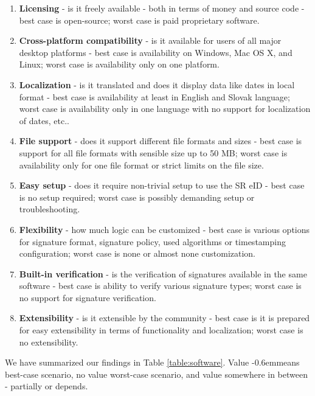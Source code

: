 \documentclass[thesismargins, english, thesislinespacing, onelinechapterstyle, upjsfrontpage]{rnthesis}
\newcommand\doublecheck{\checkmark\kern-0.6em\checkmark}
\begin{document}
\begin{enumerate}
  \item \textbf{Licensing} - is it freely available - both in terms of money and source code - best case is open-source; worst case is paid proprietary software.
  \item \textbf{Cross-platform compatibility} - is it available for users of all major desktop platforms - best case is availability on Windows, Mac OS X, and Linux; worst case is availability only on one platform.
  \item \textbf{Localization} - is it translated and does it display data like dates in local format - best case is availability at least in English and Slovak language; worst case is availability only in one language with no support for localization of dates, etc..
  \item \textbf{File support} - does it support different file formats and sizes - best case is support for all file formats with sensible size up to 50 MB; worst case is availability only for one file format or strict limits on the file size.
  \item \textbf{Easy setup} - does it require non-trivial setup to use the SR eID - best case is no setup required; worst case is possibly demanding setup or troubleshooting.
  \item \textbf{Flexibility} - how much logic can be customized - best case is various options for signature format, signature policy, used algorithms or timestamping configuration; worst case is none or almost none customization.
  \item \textbf{Built-in verification} - is the verification of signatures available in the same software - best case is ability to verify various signature types; worst case is no support for signature verification.
  \item \textbf{Extensibility} - is it extensible by the community - best case is it is prepared for easy extensibility in terms of functionality and localization; worst case is no extensibility.
\end{enumerate}

We have summarized our findings in Table \ref{table:software}. Value \doublecheck means best-case scenario, no value worst-case scenario, and value \checkmark somewhere in between - partially or depends.
\end{document}
